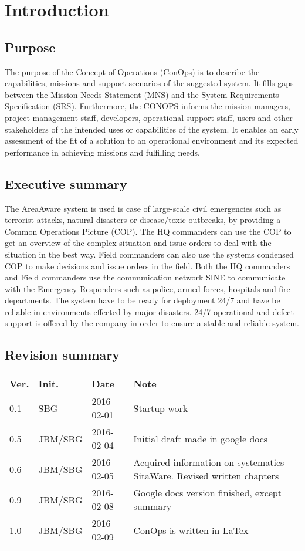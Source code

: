 \chapter{Introduction}
\label{chp_intro}

\section{Purpose}
The purpose of the Concept of Operations (ConOps) is to describe the capabilities, missions and support scenarios of the suggested system. It fills gaps between the Mission Needs Statement (MNS) and the System Requirements Specification (SRS).
Furthermore, the CONOPS informs the mission managers, project management staff, developers, operational support staff, users and other stakeholders of the intended uses or capabilities of the system. It enables an early assessment of the fit of a solution to an operational environment and its expected performance in achieving missions and fulfilling needs.

\section{Executive summary}
The AreaAware system is used is case of large-scale civil emergencies such as terrorist attacks, natural disasters or disease/toxic outbreaks, by providing a Common Operations Picture (COP). The HQ commanders can use the COP to get an overview of the complex situation and issue orders to deal with the situation in the best way. Field commanders can also use the systems condensed COP to make decisions and issue orders in the field. Both the HQ commanders and Field commanders use the communication network SINE to communicate with the Emergency Responders such as police, armed forces, hospitals and fire departments. The system have to be ready for deployment 24/7 and have be reliable in environments effected by major disasters. 24/7 operational and defect support is offered by the company in order to ensure a stable and reliable system.

\section{Revision summary}

\begin{tabular}{b{1cm} b{2cm} b{2cm} b{7cm}}
    \textbf{Ver.} & \textbf{Init.} & \textbf{Date} & \textbf{Note} \\
    \hline
    0.1  & SBG		& 2016-02-01 & Startup work \\
    0.5  & JBM/SBG	& 2016-02-04 & Initial draft made in google docs \\
    0.6  & JBM/SBG	& 2016-02-05 & Acquired information on systematics SitaWare. Revised written chapters \\
    0.9  & JBM/SBG	& 2016-02-08 & Google docs version finished, except summary \\
    1.0  & JBM/SBG	& 2016-02-09 & ConOps is written in LaTex \\
\end{tabular}